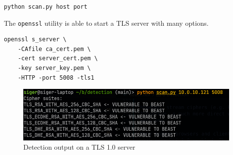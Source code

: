 \documentclass{acm_proc_article-sp}
\begin{document}
\begin{lstlisting}[language=bash]
python scan.py host port
\end{lstlisting}

The \texttt{openssl} utility is able to start a TLS server with many options.

\begin{lstlisting}
openssl s_server \
    -CAfile ca_cert.pem \
    -cert server_cert.pem \
    -key server_key.pem \
    -HTTP -port 5008 -tls1
\end{lstlisting}

\begin{figure}[htb]
    \centering
    \includegraphics[keepaspectratio, width=\linewidth]{./figures/detection-output.png}
    \caption{Detection output on a TLS 1.0 server}
\end{figure}


%
%
\balancecolumns
\appendix
\balancecolumns
\end{document}

